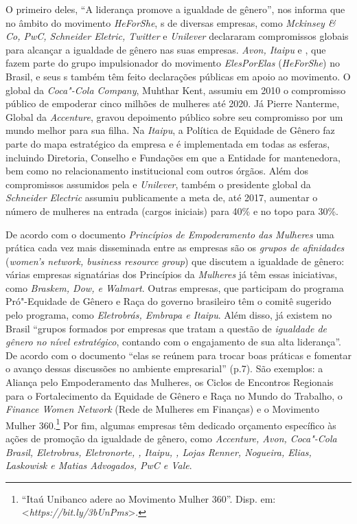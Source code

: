 O primeiro deles, ``A liderança promove a igualdade de gênero'', nos
informa que no âmbito do movimento \emph{HeForShe}, s de diversas
empresas, como \emph{Mckinsey \& Co, PwC, Schneider Eletric, Twitter} e
\emph{Unilever} declararam compromissos globais para alcançar a
igualdade de gênero nas suas empresas. \emph{Avon, Itaipu} e
\emph{}, que fazem parte do grupo impulsionador do movimento
\emph{ElesPorElas} (\emph{HeForShe}) no Brasil, e seus s também têm
feito declarações públicas em apoio ao movimento. O  global da
\emph{Coca"-Cola Company}, Muhthar Kent, assumiu em 2010 o compromisso
público de empoderar cinco milhões de mulheres até 2020. Já Pierre
Nanterme,  Global da \emph{Accenture}, gravou depoimento público
sobre seu compromisso por um mundo melhor para sua filha. Na
\emph{Itaipu}, a Política de Equidade de Gênero faz parte do mapa
estratégico da empresa e é implementada em todas as esferas, incluindo
Diretoria, Conselho e Fundações em que a Entidade for mantenedora, bem
como no relacionamento institucional com outros órgãos. Além dos
compromissos assumidos pela \emph{} e \emph{Unilever}, também o
presidente global da \emph{Schneider Electric} assumiu publicamente a
meta de, até 2017, aumentar o número de mulheres na entrada (cargos
iniciais) para 40\% e no topo para 30\%.

De acordo com o documento \emph{Princípios de Empoderamento das
Mulheres} uma prática cada vez mais disseminada entre as empresas são os
\emph{grupos de afinidades} (\emph{women's network, business resource
group}) que discutem a igualdade de gênero: várias empresas signatárias
dos Princípios da \emph{ Mulheres} já têm essas iniciativas, como
\emph{Braskem, Dow,  e Walmart}. Outras empresas, que participam do
programa Pró"-Equidade de Gênero e Raça do governo brasileiro têm o
comitê sugerido pelo programa, como \emph{Eletrobrás, Embrapa e Itaipu}.
Além disso, já existem no Brasil ``grupos formados por empresas que
tratam a questão de \emph{igualdade de gênero no nível estratégico},
contando com o engajamento de sua alta liderança''. De acordo com o
documento ``elas se reúnem para trocar boas práticas e fomentar o avanço
dessas discussões no ambiente empresarial'' (p.7). São exemplos: a
Aliança pelo Empoderamento das Mulheres, os Ciclos de Encontros
Regionais para o Fortalecimento da Equidade de Gênero e Raça no Mundo do
Trabalho, o \emph{Finance Women Network} (Rede de Mulheres em Finanças)
e o Movimento Mulher 360.\footnote{``Itaú Unibanco adere ao Movimento
  Mulher 360''. Disp. em:
  \textless{}\emph{https://bit.ly/3bUnPms}\textgreater{}.}
Por fim, algumas empresas têm dedicado orçamento específico às ações de
promoção da igualdade de gênero, como \emph{Accenture, Avon, Coca"-Cola
Brasil, Eletrobras, Eletronorte, , Itaipu, , Lojas Renner,
Nogueira, Elias, Laskowisk e Matias Advogados, PwC e Vale}.

